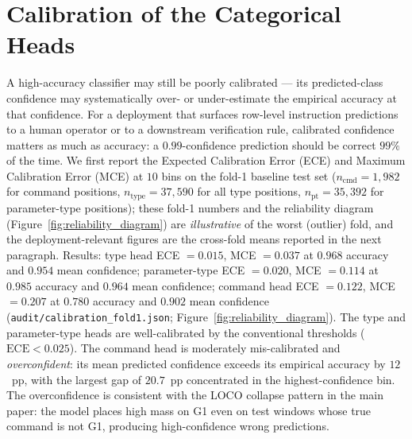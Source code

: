 \documentclass[11pt,a4paper]{article}
\begin{document}
\section{Calibration of the Categorical Heads}
\label{supp:sec-calibration}

A high-accuracy classifier may still be poorly calibrated --- its predicted-class confidence may systematically over- or under-estimate the empirical accuracy at that confidence. For a deployment that surfaces row-level instruction predictions to a human operator or to a downstream verification rule, calibrated confidence matters as much as accuracy: a $0.99$-confidence prediction should be correct $99\%$ of the time. We first report the Expected Calibration Error (ECE) and Maximum Calibration Error (MCE) at $10$ bins on the fold-1 baseline test set ($n_{\text{cmd}} = 1{,}982$ for command positions, $n_{\text{type}} = 37{,}590$ for all type positions, $n_{\text{pt}} = 35{,}392$ for parameter-type positions); these fold-1 numbers and the reliability diagram (Figure~\ref{fig:reliability_diagram}) are \emph{illustrative} of the worst (outlier) fold, and the deployment-relevant figures are the cross-fold means reported in the next paragraph. Results: type head ECE $= 0.015$, MCE $= 0.037$ at $0.968$ accuracy and $0.954$ mean confidence; parameter-type ECE $= 0.020$, MCE $= 0.114$ at $0.985$ accuracy and $0.964$ mean confidence; command head ECE $= 0.122$, MCE $= 0.207$ at $0.780$ accuracy and $0.902$ mean confidence (\texttt{audit/calibration\_fold1.json}; Figure~\ref{fig:reliability_diagram}). The type and parameter-type heads are well-calibrated by the conventional thresholds ($\text{ECE} < 0.025$). The command head is moderately mis-calibrated and \emph{overconfident}: its mean predicted confidence exceeds its empirical accuracy by $12$~pp, with the largest gap of $20.7$~pp concentrated in the highest-confidence bin. The overconfidence is consistent with the LOCO collapse pattern in the main paper: the model places high mass on G1 even on test windows whose true command is not G1, producing high-confidence wrong predictions.
\end{document}
